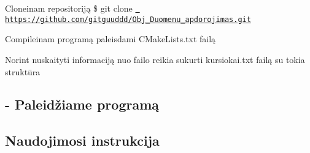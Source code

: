 
\begin{DoxyEnumerate}
\item Clone\textquotesingle{}inam repositoriją {\ttfamily \$ git clone \href{https://github.com/gitguuddd/Obj_Duomenu_apdorojimas.git}{\texttt{ https\+://github.\+com/gitguuddd/\+Obj\+\_\+\+Duomenu\+\_\+apdorojimas.\+git}}}
\item Compile\textquotesingle{}inam programą paleisdami C\+Make\+Lists.\+txt failą
\item Norint nuskaityti informaciją nuo failo reikia sukurti kursiokai.\+txt failą su tokia struktūra 
\begin{DoxyCode}{0}
\end{DoxyCode}
 \subsection*{-\/ Paleidžiame programą }
\end{DoxyEnumerate}

\subsection*{Naudojimosi instrukcija}


